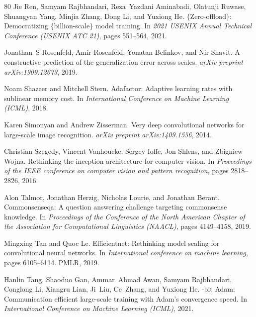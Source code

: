 \documentclass[10pt,twocolumn,letterpaper]{article}
\theoremstyle{plain}
\theoremstyle{definition}
\theoremstyle{remark}
\begin{document}
{\begin{thebibliography}{80}
Jie Ren, Samyam Rajbhandari, Reza~Yazdani Aminabadi, Olatunji Ruwase, Shuangyan
  Yang, Minjia Zhang, Dong Li, and Yuxiong He.
\newblock $\{$Zero-offload$\}$: Democratizing $\{$billion-scale$\}$ model
  training.
\newblock In \emph{2021 USENIX Annual Technical Conference (USENIX ATC 21)},
  pages 551--564, 2021.

Jonathan~S Rosenfeld, Amir Rosenfeld, Yonatan Belinkov, and Nir Shavit.
\newblock A constructive prediction of the generalization error across scales.
\newblock \emph{arXiv preprint arXiv:1909.12673}, 2019.

Noam Shazeer and Mitchell Stern.
\newblock Adafactor: Adaptive learning rates with sublinear memory cost.
\newblock In \emph{International Conference on Machine Learning (ICML)}, 2018.

Karen Simonyan and Andrew Zisserman.
\newblock Very deep convolutional networks for large-scale image recognition.
\newblock \emph{arXiv preprint arXiv:1409.1556}, 2014.

Christian Szegedy, Vincent Vanhoucke, Sergey Ioffe, Jon Shlens, and Zbigniew
  Wojna.
\newblock Rethinking the inception architecture for computer vision.
\newblock In \emph{Proceedings of the IEEE conference on computer vision and
  pattern recognition}, pages 2818--2826, 2016.

Alon Talmor, Jonathan Herzig, Nicholas Lourie, and Jonathan Berant.
\newblock Commonsenseqa: A question answering challenge targeting commonsense
  knowledge.
\newblock In \emph{Proceedings of the Conference of the North American Chapter
  of the Association for Computational Linguistics (NAACL)}, pages 4149--4158,
  2019.

Mingxing Tan and Quoc Le.
\newblock Efficientnet: Rethinking model scaling for convolutional neural
  networks.
\newblock In \emph{International conference on machine learning}, pages
  6105--6114. PMLR, 2019.

Hanlin Tang, Shaoduo Gan, Ammar~Ahmad Awan, Samyam Rajbhandari, Conglong Li,
  Xiangru Lian, Ji~Liu, Ce~Zhang, and Yuxiong He.
-bit {A}dam: Communication efficient large-scale training with
  {A}dam's convergence speed.
\newblock In \emph{International Conference on Machine Learning (ICML)}, 2021.


\end{thebibliography}}
\end{document}

